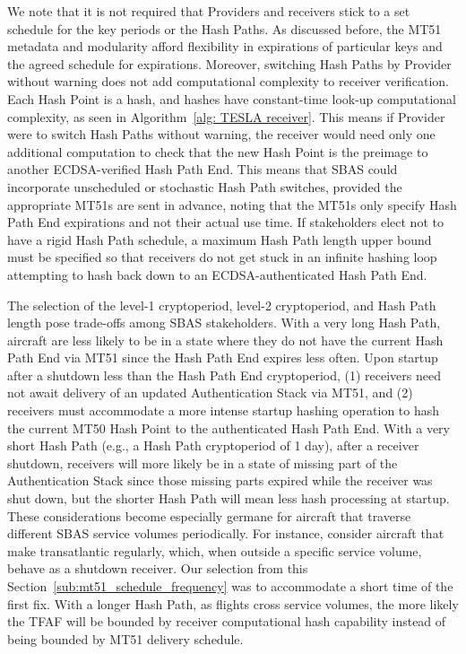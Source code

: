 \documentclass[APA,STIX1COL]{IONjournal/ION-APA Template}
\begin{document}
		We note that it is not required that Providers and receivers stick to a set schedule for the key periods or the Hash Paths.
		As discussed before, the MT51 metadata and modularity afford flexibility in expirations of particular keys and the agreed schedule for expirations.
		Moreover, switching Hash Paths by Provider without warning does not add computational complexity to receiver verification.
		Each Hash Point is a hash, and hashes have constant-time look-up computational complexity, as seen in Algorithm~\ref{alg: TESLA receiver}.
		This means if Provider were to switch Hash Paths without warning, the receiver would need only one additional computation to check that the new Hash Point is the preimage to another ECDSA-verified Hash Path End.
		This means that SBAS could incorporate unscheduled or stochastic Hash Path switches, provided the appropriate MT51s are sent in advance, noting that the MT51s only specify Hash Path End expirations and not their actual use time.
		If stakeholders elect not to have a rigid Hash Path schedule, a maximum Hash Path length upper bound must be specified so that receivers do not get stuck in an infinite hashing loop attempting to hash back down to an ECDSA-authenticated Hash Path End.

		The selection of the level-1 cryptoperiod, level-2 cryptoperiod, and Hash Path length pose trade-offs among SBAS stakeholders.
		With a very long Hash Path, aircraft are less likely to be in a state where they do not have the current Hash Path End via MT51 since the Hash Path End expires less often.
		Upon startup after a shutdown less than the Hash Path End cryptoperiod, (1) receivers need not await delivery of an updated Authentication Stack via MT51, and (2) receivers must accommodate a more intense startup hashing operation to hash the current MT50 Hash Point to the authenticated Hash Path End.
		With a very short Hash Path (e.g., a Hash Path cryptoperiod of 1 day), after a receiver shutdown, receivers will more likely be in a state of missing part of the Authentication Stack since those missing parts expired while the receiver was shut down, but the shorter Hash Path will mean less hash processing at startup.
		These considerations become especially germane for aircraft that traverse different SBAS service volumes periodically.
		For instance, consider aircraft that make transatlantic regularly, which, when outside a specific service volume, behave as a shutdown receiver.
		Our selection from this Section~\ref{sub:mt51_schedule_frequency} was to accommodate a short time of the first fix.
		With a longer Hash Path, as flights cross service volumes, the more likely the TFAF will be bounded by receiver computational hash capability instead of being bounded by MT51 delivery schedule.
\end{document}
